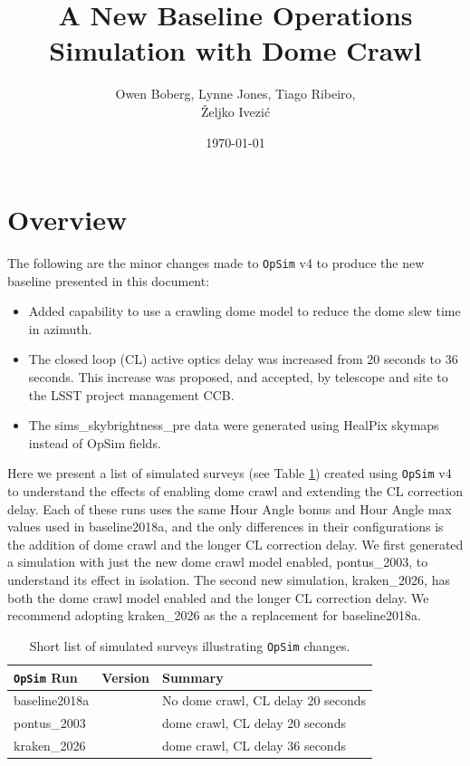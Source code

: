 \documentclass[DM,lsstdraft,authoryear,toc]{lsstdoc}
\title{A New Baseline Operations Simulation with Dome Crawl}
\author{%
Owen Boberg,
Lynne Jones,
Tiago Ribeiro, \\
\v{Z}eljko Ivezi\'{c}}
\date{\today}
\newcommand{\opsim}{\texttt{OpSim}\xspace}
\begin{document}
\maketitle

\section{Overview}

The following are the minor changes made to \opsim v4 to produce the new baseline presented in this document:

\begin{itemize}
\item Added capability to use a crawling dome model to reduce the dome slew time in azimuth.
\item The closed loop (CL) active optics delay was increased from 20 seconds to 36 seconds.
This increase was proposed, and accepted, by telescope and site to the LSST project management CCB.
\item The sims\_skybrightness\_pre data were generated using HealPix skymaps instead of OpSim fields.
\end{itemize}

Here we present a list of simulated surveys (see Table \ref{tab:runlist}) created using \opsim v4 to understand
the effects of enabling dome crawl and extending the CL correction delay. Each of these runs uses the same Hour
Angle bonus and Hour Angle max values used in baseline2018a, and the only differences in their configurations is the
addition of dome crawl and the longer CL correction delay. We first generated a simulation with just the new dome crawl model
enabled, pontus\_2003, to understand its effect in isolation. The second new simulation, kraken\_2026, has both the 
dome crawl model enabled and the longer CL correction delay. We recommend adopting kraken\_2026 as the a replacement
for baseline2018a.

\begin{table}[htp]
\caption{Short list of simulated surveys illustrating \opsim changes.}
\begin{center}
\begin{tabular}{ l | l | l }
\toprule
\opsim Run & Version & Summary \\
\midrule
baseline2018a &   &  No dome crawl, CL delay 20 seconds\\
pontus\_2003  &   &  dome crawl, CL delay 20 seconds\\
kraken\_2026  &   &  dome crawl, CL delay 36 seconds\\  
\bottomrule
\end{tabular}
\end{center}
\label{tab:runlist}
\end{table}
\end{document}
